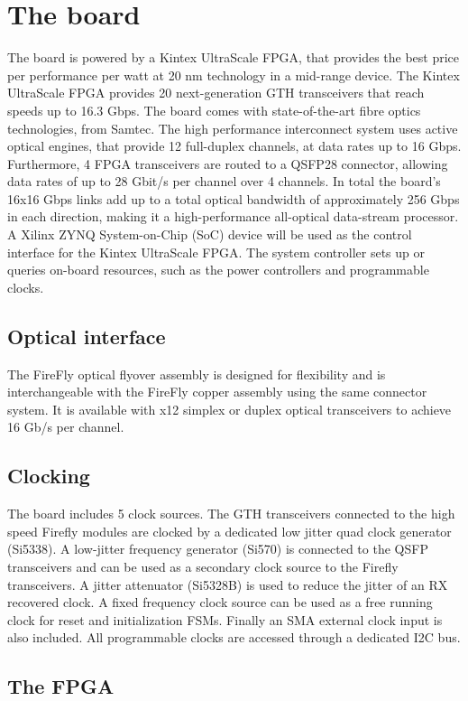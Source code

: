 \documentclass[a4paper]{PoS}
\begin{document}
\section{The board}
The board is powered by a Kintex UltraScale FPGA, that provides the best price per performance per watt at 20 nm technology in a mid-range device. The Kintex UltraScale FPGA provides 20 next-generation GTH transceivers that reach speeds up to 16.3 Gbps. The board comes with state-of-the-art fibre optics technologies, from Samtec. The high performance interconnect system uses active optical engines, that provide 12 full-duplex channels, at data rates up to 16 Gbps. Furthermore, 4 FPGA transceivers are routed to a QSFP28 connector, allowing data rates of up to 28 Gbit/s per channel over 4 channels. In total the board’s 16x16 Gbps links add up to a total optical bandwidth of approximately 256 Gbps in each direction, making it a high-performance all-optical data-stream processor. 
A Xilinx ZYNQ System-on-Chip (SoC) device will be used as the control interface for the Kintex UltraScale FPGA. The system controller sets up or queries on-board resources, such as the power controllers and programmable clocks.


\subsection{Optical interface}
The FireFly optical flyover assembly is designed for flexibility and is interchangeable with the FireFly copper assembly using the same connector system. It is available with x12 simplex or duplex optical transceivers to achieve 16 Gb/s per channel.


\subsection{Clocking}
The board includes 5 clock sources. The GTH transceivers connected to the high speed Firefly modules are clocked by a dedicated low jitter quad clock generator (Si5338). A low-jitter frequency generator (Si570) is connected to the QSFP transceivers and can be used as a secondary clock source to the Firefly transceivers. A jitter attenuator (Si5328B) is used to reduce the jitter of an RX recovered clock. A fixed frequency clock source can be used as a free running clock for reset and initialization FSMs. Finally an SMA external clock input is also included. All programmable clocks are accessed through a dedicated I2C bus.


\subsection{The FPGA}
\end{document}
